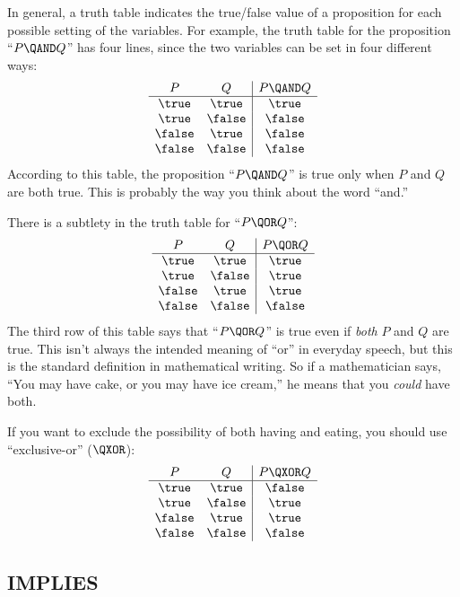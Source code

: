 In general, a truth table indicates the true/false value of a proposition
for each possible setting of the variables.  For example, the truth table
for the proposition ``$P \QAND Q$'' has four lines, since the two
variables can be set in four different ways:
%
\[
\begin{array}{cc|c}
P & Q & P \QAND Q \\ \hline
\true & \true & \true \\
\true & \false & \false \\
\false & \true & \false \\
\false & \false & \false
\end{array}
\]
%
According to this table, the proposition ``$P \QAND Q$'' is true only when
$P$ and $Q$ are both true.  This is probably the way you think about the
word ``and.''

There is a subtlety in the truth table for ``$P \QOR Q$'':
%
\[
\begin{array}{cc|c}
P & Q & P \QOR Q \\ \hline
\true & \true & \true \\
\true & \false & \true \\
\false & \true & \true \\
\false & \false & \false
\end{array}
\]
%
The third row of this table says that ``$P \QOR Q$'' is true even if
\textit{both} $P$ and $Q$ are true.  This isn't always the intended
meaning of ``or'' in everyday speech, but this is the standard definition
in mathematical writing.  So if a mathematician says, ``You may have cake,
or you may have ice cream,'' he means that you \textit{could} have both.

If you want to exclude the possibility of both having and eating, you should use
``exclusive-or'' ($\QXOR$):
%
\[\begin{array}{cc|c}
P & Q & P \QXOR Q \\ \hline
\true & \true & \false \\
\true & \false & \true \\
\false & \true & \true \\
\false & \false & \false
\end{array}
\]
%

\subsection{IMPLIES}


